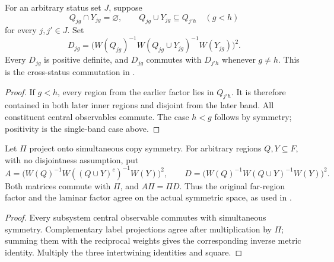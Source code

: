 \begin{theorem}
\label{thm:laminar_replica_band_commutation}
\leanok
For an arbitrary status set $J$, suppose
\[
 Q_{jg}\cap Y_{jg}=\varnothing,\qquad
 Q_{jg}\cup Y_{jg}\subseteq Q_{j'h}\quad(g<h)
\]
for every $j,j'\in J$. Set
\[
 D_{jg}=\bigl(W(Q_{jg})^{-1}W(Q_{jg}\cup Y_{jg})^{-1}W(Y_{jg})\bigr)^2.
\]
Every $D_{jg}$ is positive definite, and $D_{jg}$ commutes with $D_{j'h}$
whenever $g\ne h$. This is the cross-status commutation in
\cite[Section~7, lines~268--276; Section~8, lines~20--37]{OpenAI2026AreaLaw}.
\end{theorem}
\begin{proof}
\leanok
{}
If $g<h$, every region from the earlier factor lies in $Q_{j'h}$.
It is therefore contained in both later inner regions and disjoint from
the later band. All constituent central observables commute. The case
$h<g$ follows by symmetry; positivity is the single-band case above.
\end{proof}

\begin{theorem}
\label{thm:symmetric_replica_factor_action}
\leanok
Let $\Pi$ project onto simultaneous copy symmetry. For arbitrary regions
$Q,Y\subseteq F$, with no disjointness assumption, put
\[
 A=\bigl(W(Q)^{-1}W((Q\cup Y)^c)^{-1}W(Y)\bigr)^2,
 \qquad D=\bigl(W(Q)^{-1}W(Q\cup Y)^{-1}W(Y)\bigr)^2.
\]
Both matrices commute with $\Pi$, and $A\Pi=\Pi D$.
Thus the original far-region factor and the laminar factor agree on the
actual symmetric space, as used in
\cite[Section~8, lines~299--308]{OpenAI2026AreaLaw}.
\end{theorem}
\begin{proof}
\leanok
{}
Every subsystem central observable commutes with simultaneous symmetry.
Complementary label projections agree after multiplication by $\Pi$;
summing them with the reciprocal weights gives the corresponding inverse
metric identity. Multiply the three intertwining identities and square.
\end{proof}
